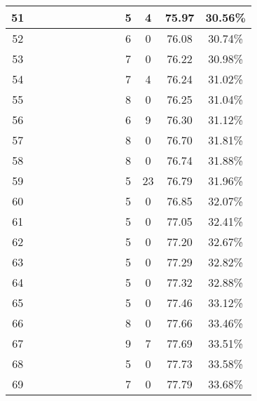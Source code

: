 \begin{longtable}{|c|c|c|c|c|c|c|c|c|c|c|c|c|}
51 &  \x    & \x    & \x    & \x    & \x    &       &       & \x\m  & 5 & 4 & 75.97 & 30.56\% \\ \hline
52 &  \x    & \x    &       & \x    & \x\m  &       & \x\m  &       & 6 & 0 & 76.08 & 30.74\% \\ \hline
53 &  \x    & \x    &       & \x    & \x\m  & \x\m  & \x\m  &       & 7 & 0 & 76.22 & 30.98\% \\ \hline
54 &  \x    & \x    & \x    &       & \x    & \x\m  & \x    &       & 7 & 4 & 76.24 & 31.02\% \\ \hline
55 &  \x    & \x    & \x    &       & \x\m  &       &       & \x\m  & 8 & 0 & 76.25 & 31.04\% \\ \hline
56 &  \x    & \x    &       &       & \x\m  &       &       & \x\m  & 6 & 9 & 76.30 & 31.12\% \\ \hline
57 &  \x    & \x    &       &       & \x\m  & \x\m  &       & \x\m  & 8 & 0 & 76.70 & 31.81\% \\ \hline
58 &  \x    & \x    & \x    & \x    &       &       &       &       & 8 & 0 & 76.74 & 31.88\% \\ \hline
59 &  \x    & \x    &       &       & \x\m  &       &       &       & 5 & 23 & 76.79 & 31.96\% \\ \hline
60 &  \x    & \x    &       & \x    & \x\m  & \x\m  &       &       & 5 & 0 & 76.85 & 32.07\% \\ \hline
61 &  \x    & \x    &       & \x    & \x\m  &       &       & \x\m  & 5 & 0 & 77.05 & 32.41\% \\ \hline
62 &  \x    & \x    & \x    & \x    &       & \x    & \x    &       & 5 & 0 & 77.20 & 32.67\% \\ \hline
63 &  \x    & \x    & \x    & \x    & \x    & \x    &       &       & 5 & 0 & 77.29 & 32.82\% \\ \hline
64 &  \x    & \x    & \x    &       &       & \x\m  & \x    &       & 5 & 0 & 77.32 & 32.88\% \\ \hline
65 &  \x    & \x    & \x    &       & \x    & \x    &       & \x\m  & 5 & 0 & 77.46 & 33.12\% \\ \hline
66 &  \x    & \x    & \x    & \x    &       &       &       &       & 8 & 0 & 77.66 & 33.46\% \\ \hline
67 &  \x    & \x    &       &       & \x    &       &       &       & 9 & 7 & 77.69 & 33.51\% \\ \hline
68 &  \x    & \x    & \x    &       & \x    & \x\m  & \x\m  &       & 5 & 0 & 77.73 & 33.58\% \\ \hline
69 &  \x    & \x    &       & \x    & \x\m  &       &       &       & 7 & 0 & 77.79 & 33.68\% \\ \hline

\end{longtable}
